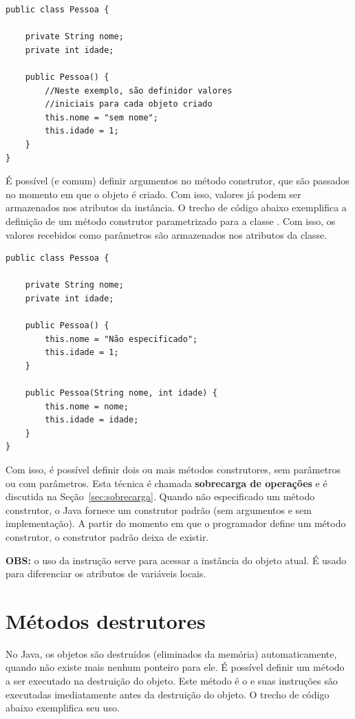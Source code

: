 \begin{verbatim}
public class Pessoa { 
	
	private String nome; 
	private int idade; 
	
	public Pessoa() { 
		//Neste exemplo, são definidor valores 
		//iniciais para cada objeto criado 
		this.nome = "sem nome"; 
		this.idade = 1; 
	} 
}
\end{verbatim}

É possível (e comum) definir argumentos no método construtor, que são passados no momento em que o objeto é criado. Com isso, valores já podem ser armazenados nos atributos da instância. O trecho de código abaixo exemplifica a definição de um método construtor parametrizado para a classe . Com isso, os valores recebidos como parâmetros são armazenados nos atributos da classe.

\begin{verbatim}
public class Pessoa { 
	
	private String nome; 
	private int idade; 
	
	public Pessoa() { 
		this.nome = "Não especificado"; 
		this.idade = 1; 
	} 
	
	public Pessoa(String nome, int idade) { 
		this.nome = nome; 
		this.idade = idade; 
	} 
}
\end{verbatim}
 
Com isso, é possível definir dois ou mais métodos construtores, sem parâmetros ou com parâmetros. Esta técnica é chamada \textbf{sobrecarga de operações} e é discutida na Seção~\ref{sec:sobrecarga}. Quando não especificado um método construtor, o Java fornece um construtor padrão (sem argumentos e sem implementação). A partir do momento em que o programador define um método construtor, o construtor padrão deixa de existir.

\textbf{OBS:} o uso da instrução  serve para acessar a instância do objeto atual. É usado para diferenciar os atributos de variáveis locais.
 
 
\section{Métodos destrutores}
No Java, os objetos são destruídos (eliminados da memória) automaticamente, quando não existe mais nenhum ponteiro para ele. É possível definir um método a ser executado na destruição do objeto. Este método é o  e suas instruções são executadas imediatamente antes da destruição do objeto. O trecho de código abaixo exemplifica seu uso.

